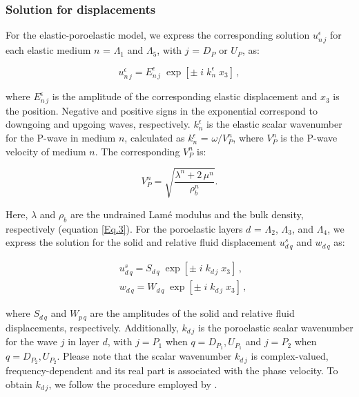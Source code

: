 \documentclass[draft]{agujournal2019}
\begin{document}
\subsubsection{Solution for displacements}
For the elastic-poroelastic model, we express
the corresponding solution $u_{n\,j}^\epsilon$ for each elastic medium $n$ = $\Lambda_1$ and $\Lambda_5$, with $j$ = $D_P$ or $U_P$, as:
\begin{linenomath*}
\begin{equation}\label{Eq.10}
u_{n\,j}^{\epsilon} = E_{n \,j}^{\epsilon} \;\exp[ \pm\; i \; k_{n}^{\epsilon} \; x_3 ]\,,
\end{equation}
\end{linenomath*}
where $E_{n \,j}^{\epsilon}$ is the amplitude of the corresponding elastic displacement and $x_3$ is the position. Negative and positive signs in the exponential correspond to downgoing and upgoing waves, respectively. $ k_{n}^{\epsilon}$ is the elastic scalar wave\-number for the P-wave in medium $n$, calculated as $ k_{n}^\epsilon$ = $\omega / V_P^n$, where $V_P^n$ is the P-wave velocity of medium $n$. 
The corresponding $V_P^n$ is:
\begin{linenomath*}
\begin{equation}\label{Eq.12}
V_P^n = \sqrt{\frac{\lambda^n +  2\, \mu^n}{\rho_b^n}} .
\end{equation}
\end{linenomath*}
Here, $\lambda$ and $\rho_b$ are the undrained Lamé modulus and the bulk density, respectively (equation \eqref{Eq.3}).
For the poro\-elastic layers  $d$ = $\Lambda_2$, $\Lambda_3$, and $\Lambda_4$, we express the solution for the solid and relative fluid displacement $u_{d\,q}^s$ and $w_{d\, q}$ as:
\begin{linenomath*}
\begin{equation}\label{Eq.11}
\begin{split}
& u_{d\,q}^s = S_{d\, q}\;\exp[ \pm \; i \; k_{d \,j} \; x_3 ] \, ,\\
& w_{d \,q} = W_{d\,q}\;\exp[\pm \; i\;  k_{d\,j} \;x_3 ] \, ,
\end{split}
\end{equation}
\end{linenomath*}
where $ S_{d\, q}$ and $W_{p\,q}$
are the amplitudes of the solid and relative fluid displacements, respectively. Additionally, 
$ k_{d\,j}$ is the poroelastic scalar wave\-number for the wave $j$ in layer $d$, with $j=P_1$ when $q=D_{P_1},U_{P_1}$ and $j=P_2$ when $q=D_{P_2},U_{P_2}$. Please note that the scalar wave\-number $ k_{d\,j}$ is complex-valued, frequency-dependent and its real part is associated with the phase velocity. To obtain
$ k_{d\,j}$, we follow the procedure employed by .
\end{document}
